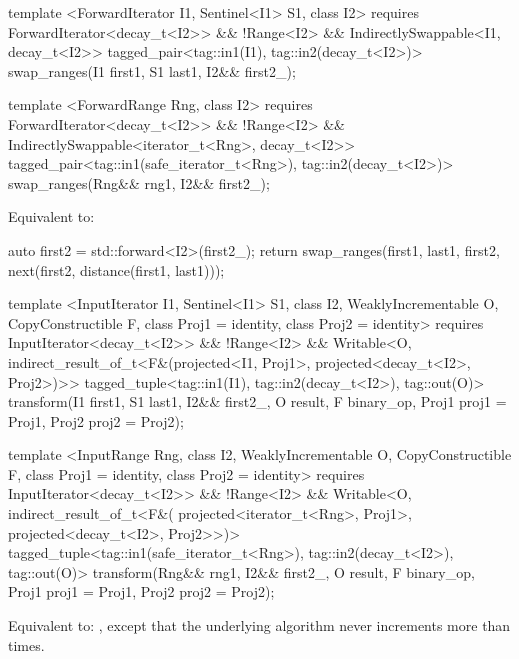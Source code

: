 \begin{codeblock}
template <ForwardIterator I1, Sentinel<I1> S1, class I2>
  requires ForwardIterator<decay_t<I2>> && !Range<I2> &&
    IndirectlySwappable<I1, decay_t<I2>>
  tagged_pair<tag::in1(I1), tag::in2(decay_t<I2>)>
    swap_ranges(I1 first1, S1 last1, I2&& first2_);

template <ForwardRange Rng, class I2>
  requires ForwardIterator<decay_t<I2>> && !Range<I2> &&
    IndirectlySwappable<iterator_t<Rng>, decay_t<I2>>
  tagged_pair<tag::in1(safe_iterator_t<Rng>), tag::in2(decay_t<I2>)>
    swap_ranges(Rng&& rng1, I2&& first2_);
\end{codeblock}

\pnum
\effects
Equivalent to:
\begin{codeblock}
  auto first2 = std::forward<I2>(first2_);
  return swap_ranges(first1, last1, first2, next(first2, distance(first1, last1)));
\end{codeblock}

\begin{codeblock}
template <InputIterator I1, Sentinel<I1> S1, class I2, WeaklyIncrementable O,
    CopyConstructible F, class Proj1 = identity, class Proj2 = identity>
  requires InputIterator<decay_t<I2>> && !Range<I2> &&
    Writable<O, indirect_result_of_t<F&(projected<I1, Proj1>,
        projected<decay_t<I2>, Proj2>)>>
  tagged_tuple<tag::in1(I1), tag::in2(decay_t<I2>), tag::out(O)>
    transform(I1 first1, S1 last1, I2&& first2_, O result,
              F binary_op, Proj1 proj1 = Proj1{}, Proj2 proj2 = Proj2{});

template <InputRange Rng, class I2, WeaklyIncrementable O, CopyConstructible F,
    class Proj1 = identity, class Proj2 = identity>
  requires InputIterator<decay_t<I2>> && !Range<I2> &&
    Writable<O, indirect_result_of_t<F&(
        projected<iterator_t<Rng>, Proj1>, projected<decay_t<I2>, Proj2>>)>
  tagged_tuple<tag::in1(safe_iterator_t<Rng>), tag::in2(decay_t<I2>), tag::out(O)>
    transform(Rng&& rng1, I2&& first2_, O result,
              F binary_op, Proj1 proj1 = Proj1{}, Proj2 proj2 = Proj2{});
\end{codeblock}

\pnum
\effects
Equivalent to: ,
except that the underlying algorithm never increments  more than  times.
